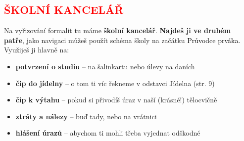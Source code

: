 \documentclass[a5paper, twoside]{article}
\newcommand{\podnadpis}[2]{
  \subsection*{\textcolor{#2}{#1}}
}
\begin{document}
\podnadpis{ŠKOLNÍ KANCELÁŘ}{red}

Na vyřizování formalit tu máme \textbf{školní kancelář}. \textbf{Najdeš ji ve druhém patře}, jako
navigaci můžeš použít schéma školy na začátku \textcolor{black}{\Kapitan Průvodce prváka}.
Využiješ ji hlavně na:
\begin{itemize}[leftmargin=10pt]
	\item \textbf{potvrzení o studiu} -- na šalinkartu nebo úlevy na daních
	\item \textbf{čip do jídelny} -- o tom ti víc řekneme v odstavci Jídelna (str. 9)
	\item \textbf{čip k výtahu} -- pokud si přivodíš úraz v naší (krásné!) tělocvičně
	\item \textbf{ztráty a nálezy} -- buď tady, nebo na vrátnici
	\item \textbf{hlášení úrazů} -- abychom ti mohli třeba vyjednat odškodné
\end{itemize}
\end{document}
